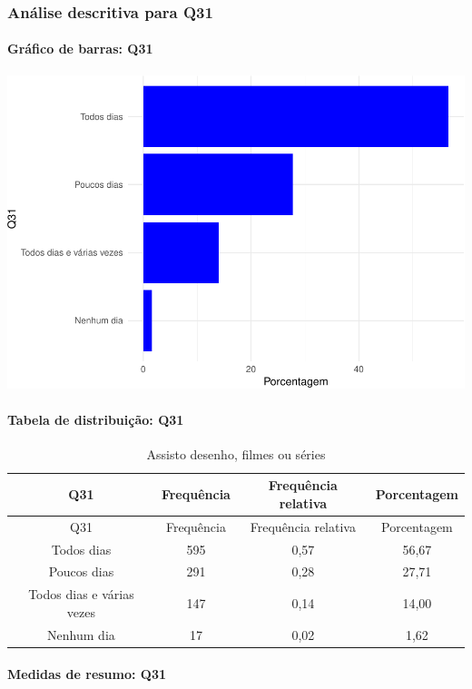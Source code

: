 \documentclass[]{article}
\let\oldparagraph\paragraph
\renewcommand{\paragraph}[1]{\oldparagraph{#1}\mbox{}}
\begin{document}
\hypertarget{anuxe1lise-descritiva-para-q31}{%
\subsubsection{Análise descritiva para Q31}\label{anuxe1lise-descritiva-para-q31}}

\hypertarget{gruxe1fico-de-barras-q31}{%
\paragraph{Gráfico de barras: Q31}\label{gruxe1fico-de-barras-q31}}

\begin{center}\includegraphics[width=0.75\linewidth]{relatorio_covid19_files/figure-latex/unnamed-chunk-1013-1} \end{center}

\hypertarget{tabela-de-distribuiuxe7uxe3o-q31}{%
\paragraph{Tabela de distribuição: Q31}\label{tabela-de-distribuiuxe7uxe3o-q31}}

\begin{longtable}[]{@{}cccc@{}}
\caption{\label{tab:unnamed-chunk-1014}Assisto desenho, filmes ou séries}\tabularnewline
\toprule
Q31 & Frequência & Frequência relativa & Porcentagem\tabularnewline
\midrule
\endfirsthead
\toprule
Q31 & Frequência & Frequência relativa & Porcentagem\tabularnewline
\midrule
\endhead
Todos dias & 595 & 0,57 & 56,67\tabularnewline
Poucos dias & 291 & 0,28 & 27,71\tabularnewline
Todos dias e várias vezes & 147 & 0,14 & 14,00\tabularnewline
Nenhum dia & 17 & 0,02 & 1,62\tabularnewline
\bottomrule
\end{longtable}

\hypertarget{medidas-de-resumo-q31}{%
\paragraph{Medidas de resumo: Q31}\label{medidas-de-resumo-q31}}
\end{document}
